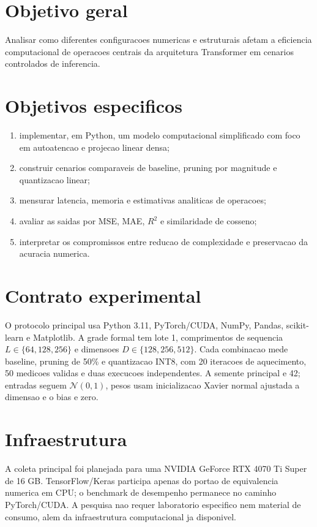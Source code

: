 \section{Objetivo geral}

Analisar como diferentes configuracoes numericas e estruturais afetam a
eficiencia computacional de operacoes centrais da arquitetura Transformer em
cenarios controlados de inferencia.

\section{Objetivos especificos}

\begin{enumerate}
  \item implementar, em Python, um modelo computacional simplificado com foco em autoatencao e projecao linear densa;
  \item construir cenarios comparaveis de baseline, pruning por magnitude e quantizacao linear;
  \item mensurar latencia, memoria e estimativas analiticas de operacoes;
  \item avaliar as saidas por MSE, MAE, $R^2$ e similaridade de cosseno;
  \item interpretar os compromissos entre reducao de complexidade e preservacao da acuracia numerica.
\end{enumerate}

\section{Contrato experimental}

O protocolo principal usa Python 3.11, PyTorch/CUDA, NumPy, Pandas,
scikit-learn e Matplotlib. A grade formal tem lote 1, comprimentos de sequencia
$L \in \{64,128,256\}$ e dimensoes $D \in \{128,256,512\}$. Cada combinacao
mede baseline, pruning de 50\% e quantizacao INT8, com 20 iteracoes de
aquecimento, 50 medicoes validas e duas execucoes independentes. A semente
principal e 42; entradas seguem $\mathcal{N}(0,1)$, pesos usam inicializacao
Xavier normal ajustada a dimensao e o bias e zero.

\section{Infraestrutura}

A coleta principal foi planejada para uma NVIDIA GeForce RTX 4070 Ti Super de
16 GB. TensorFlow/Keras participa apenas do portao de equivalencia numerica em
CPU; o benchmark de desempenho permanece no caminho PyTorch/CUDA. A pesquisa
nao requer laboratorio especifico nem material de consumo, alem da infraestrutura
computacional ja disponivel.
